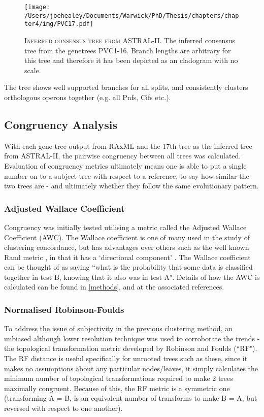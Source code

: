 \vspace{1cm}
\begin{figure}[h!]
	\centering
	\texttt{[image: /Users/joehealey/Documents/Warwick/PhD/Thesis/chapters/chapter4/img/PVC17.pdf]}
	\captionsetup{singlelinecheck=off, justification=justified, font=footnotesize, aboveskip=19pt}
	\caption[Consensus Tree]{\textsc{\normalsize Inferred consensus tree from ASTRAL-II.}\vspace{0.1cm} \newline The inferred consensus tree from the genetrees PVC1-16. Branch lengths are arbitrary for this tree and therefore it has been depicted as an cladogram with no scale.}
	\label{consensustree}
\end{figure}

The tree shows well supported branches for all splits, and consistently clusters orthologous operons together (e.g. all Pnfs, Cifs etc.).


\subsection{Congruency Analysis}
	With each gene tree output from RAxML and the 17th tree as the inferred tree from ASTRAL-II, the pairwise congruency between all trees was calculated. Evaluation of congruency metrics ultimately means one is able to put a single number on to a subject tree with respect to a reference, to say how similar the two trees are - and ultimately whether they follow the same evolutionary pattern.
	
\subsubsection{Adjusted Wallace Coefficient}
	Congruency was initially tested utilising a metric called the Adjusted Wallace Coefficient (AWC). The Wallace coefficient is one of many used in the study of clustering concordance, but has advantages over others such as the well known Rand metric \citep{Rand1971}, in that it has a `directional component' \citep{Wallace1983}. The Wallace coefficient can be thought of as saying ``what is the probability that some data is classified together in test B, knowing that it also was in test A". Details of how the AWC is calculated can be found in \vref{methods}, and at the associated references.

\subsubsection{Normalised Robinson-Foulds}
	To address the issue of subjectivity in the previous clustering method, an unbiased although lower resolution technique was used to corroborate the trends - the topological transformation metric developed by Robinson and Foulds (``RF")\citep{Robinson1981}. The RF distance is useful specifically for unrooted trees such as these, since it makes no assumptions about any particular nodes/leaves, it simply calculates the minimum number of topological transformations required to make 2 trees maximally congruent.  Because of this, the RF metric is a symmetric one (transforming A = B, is an equivalent number of transforms to make B = A, but reversed with respect to one another). 
	
